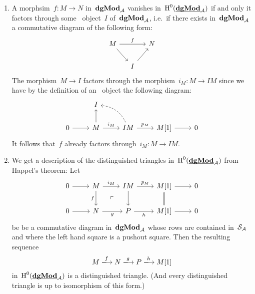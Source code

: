 \documentclass[a4paper,10pt]{scrartcl}
\begin{document}
\begin{enumerate}
  \item
    A morphsim~$f \colon M \to N$ in~$\mathbf{dgMod}_{\mathcal{A}}$ vanishes in~$\operatorname{H}^0(\underline{\smash{\mathbf{dgMod}}}_{\mathcal{A}})$ if and only it factors through some~{\injective{$\Sfrob_{\Acat}$}} object~$I$ of~$\mathbf{dgMod}_{\mathcal{A}}$, i.e.\ if there exists in~$\mathbf{dgMod}_{\mathcal{A}}$ a commutative diagram of the following form:
    \[
      \begin{tikzcd}[column sep = small]
        M
        \arrow{rr}[above]{f}
        \arrow{dr}
        &
        {}
        &
        N
        \\
        {}
        &
        I
        \arrow{ur}
        &
        {}
      \end{tikzcd}
    \]
    The morphism~$M \to I$ factors through the morphism~$i_M \colon M \to IM$ since we have by the definition of an~{\injective{$\Sfrob_{\Acat}$}} object the following diagram:
    \[
      \begin{tikzcd}
        {}
        &
        I
        &
        {}
        &
        {}
        &
        {}
        \\
        0
        \arrow{r}
        &
        M
        \arrow{u}
        \arrow{r}[above]{i_M}
        &
        IM
        \arrow[dashed, bend right]{ul}
        \arrow{r}[above]{p_M}
        &
        M[1]
        \arrow{r}
        &
        0
      \end{tikzcd}
    \]
    It follows that~$f$ already factors through~$i_M \colon M \to IM$.
  \item
    We get a description of the distinguished triangles in~$\operatorname{H}^0(\underline{\smash{\mathbf{dgMod}}}_{\mathcal{A}})$ from Happel’s theorem:
    Let
    \[
      \begin{tikzcd}
        0
        \arrow{r}
        &
        M
        \arrow{r}[above]{i_M}
        \arrow{d}[left]{f}
        \arrow[phantom]{dr}{\ulcorner}
        &
        IM
        \arrow{r}[above]{p_M}
        \arrow{d}
        &
        M[1]
        \arrow{r}
        \arrow[equal]{d}
        &
        0
        \\
        0
        \arrow{r}
        &
        N
        \arrow{r}[below]{g}
        &
        P
        \arrow{r}[below]{h}
        &
        M[1]
        \arrow{r}
        &
        0
      \end{tikzcd}
    \]
    be be a commutative diagram in~$\mathbf{dgMod}_{\mathcal{A}}$ whose rows are contained in~$\Sfrob_{\Acat}$ and where the left hand square is a pushout square.
    Then the resulting sequence
    \[
      M
      \xlongto{f}
      N
      \xlongto{g}
      P
      \xlongto{h}
      M[1]
    \]
    in~$\operatorname{H}^0(\underline{\smash{\mathbf{dgMod}}}_{\mathcal{A}})$ is a distinguished triangle.
    (And every distinguished triangle is up to isomorphism of this form.)
\end{enumerate}
\end{document}
